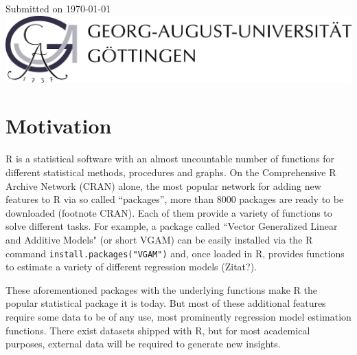 \documentclass[12pt]{article} %
\newcommand{\li}{\lstinline}
\begin{document}
\begin{titlepage}

{\large Submitted on \today}\\[3.2cm] %


\includegraphics{figures/logo}\\[1cm]
 

\vfill %
\end{titlepage}
\restoregeometry
\clearpage

\tableofcontents

\listoffigures

\listoftables

\clearpage

\section{Motivation}

R is a statistical software with an almost uncountable number of functions for different statistical methods, procedures and graphs. On the Comprehensive R Archive Network (CRAN) alone, the most popular network for adding new features to R via so called ``packages'', more than 8000 packages are ready to be downloaded (footnote CRAN). Each of them provide a variety of functions to solve different tasks. For example, a package called ``Vector Generalized Linear and Additive Models" (or short VGAM) can be easily installed via the R command \li{install.packages("VGAM")} and, once loaded in R, provides functions to estimate a variety of different regression models (Zitat?).

These aforementioned packages with the underlying functions make R the popular statistical package it is today. But most of these additional features require some data to be of any use, most prominently regression model estimation functions. There exist datasets shipped with R, but for most academical purposes, external data will be required to generate new insights.
\end{document}
